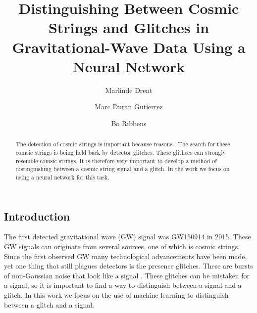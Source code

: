 \documentclass{article}
\title{\bf{Distinguishing Between Cosmic Strings and Glitches in Gravitational-Wave Data Using a Neural Network}}
\author[1]{Marlinde Drent}
\author[1]{Marc Duran Gutierrez}
\author[1]{Bo Ribbens}
\affil[1]{\it{Department of Physics, Utrecht University}}
\newcommand\C[1]\null
\begin{document}
\maketitle

\begin{abstract}
    The detection of cosmic strings is important because reasons \C{why do we want them?}. 
    The search for these comsic strings is being held back by detector glitches.
    These glithces can strongly resemble comsic strings. 
    It is therefore very important to develop a method of distinguishing between a cosmic string signal and a glitch.
    In the work we focus on using a neural network for this task.
\end{abstract}

\begin{multicols}{2}
\section{Introduction}
The first detected gravitational wave (GW) signal was GW150914\cite{PhysRevLett116061102} in 2015. 
These GW signals can originate from several sources, one of which is cosmic strings.
Since the first observed GW many technological advancements have been made, yet one thing that still plagues detectors is the presence glitches.    
These are bursts of non-Gaussian noise that look like a signal \C{Needs citation}.
These glitches can be mistaken for a signal, so it is important to find a way to distinguish between a signal and a glitch.
In this work we focus on the use of machine learning to distinguish between a glitch and a signal.


\end{multicols}
\end{document}
